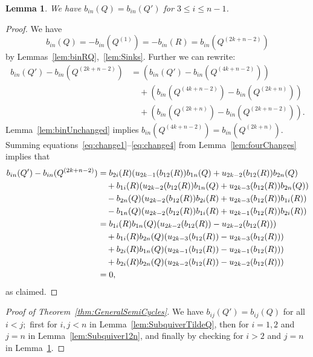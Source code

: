 \documentclass[11pt, letterpaper]{amsart}
\newtheorem{lemma}[theorem]{Lemma}
\theoremstyle{definition}
\numberwithin{equation}{section}
\begin{document}
\begin{lemma}
\label{lem:bin}
We have $b_{in}(Q) = b_{in}(Q')$ for $3 \leq i \leq n-1$.
\end{lemma}
\begin{proof}
We have
\[
b_{in}(Q) =-b_{in}(Q^{(1)}) = -b_{in}(R) = b_{in}(Q^{(2k+n-2)})
\]
by Lemmas~\ref{lem:binRQ},~\ref{lem:Sinks}.
Further we can rewrite:
\begin{align*}
b_{in}(Q') - b_{in}(Q^{(2k+n-2)}) &= (b_{in}(Q') - b_{in}(Q^{(4k+n-2)})) \\
&\quad + (b_{in}(Q^{(4k+n-2)}) - b_{in}(Q^{(2k+n)})) \\
&\quad + (b_{in}(Q^{(2k+n)}) - b_{in}(Q^{(2k+n-2)})).
\end{align*}
Lemma~\ref{lem:binUnchanged} implies $b_{in}(Q^{(4k+n-2)})\! =\! b_{in}(Q^{(2k+n)})$. 
Summing equations~\eqref{eq:change1}--\eqref{eq:change4} from Lemma~\ref{lem:fourChanges} implies that 
\begin{align*}
    b_{in}(Q') - b_{in}(Q^{(2k+n-2)}) &=  b_{2i}(R) (u_{2k-1}(b_{12}(R)) b_{1n}(Q) + u_{2k-2}(b_{12}(R)) b_{2n}(Q)\\
    &\quad + b_{1i}(R) (u_{2k-2}(b_{12}(R)) b_{1n}(Q) + u_{2k-3}(b_{12}(R)) b_{2n}(Q))\\
    &\quad - b_{2n}(Q) (u_{2k-2}(b_{12}(R)) b_{2i}(R) + u_{2k-3}(b_{12}(R)) b_{1i}(R))\\
    &\quad - b_{1n}(Q) (u_{2k-2}(b_{12}(R)) b_{1i}(R) + u_{2k-1}(b_{12}(R)) b_{2i}(R))\\
    &=  b_{1i}(R)b_{1n}(Q) (u_{2k-2}(b_{12}(R)) -  u_{2k-2}(b_{12}(R)))\\
    &\quad + b_{1i}(R)b_{2n}(Q) (u_{2k-3}(b_{12}(R)) - u_{2k-3}(b_{12}(R))) \\
    &\quad + b_{2i}(R)b_{1n}(Q) (u_{2k-1}(b_{12}(R)) - u_{2k-1}(b_{12}(R))) \\
    &\quad + b_{2i}(R)b_{2n}(Q) (u_{2k-2}(b_{12}(R)) - u_{2k-2}(b_{12}(R))) \\
    &=  0, 
\end{align*}
as claimed.
\end{proof}

\begin{proof}[Proof of Theorem~\ref{thm:GeneralSemiCycles}]
We have $b_{ij}(Q') = b_{ij}(Q)$ for all $i<j;$ first for $i,j < n$ in Lemma~\ref{lem:SubquiverTildeQ}, %
then for $i=1,2$ and $j=n$ in Lemma~\ref{lem:Subquiver12n}, %
and finally by checking for $i>2$ and $j=n$ in Lemma~\ref{lem:bin}. %
\end{proof}
\end{document}
